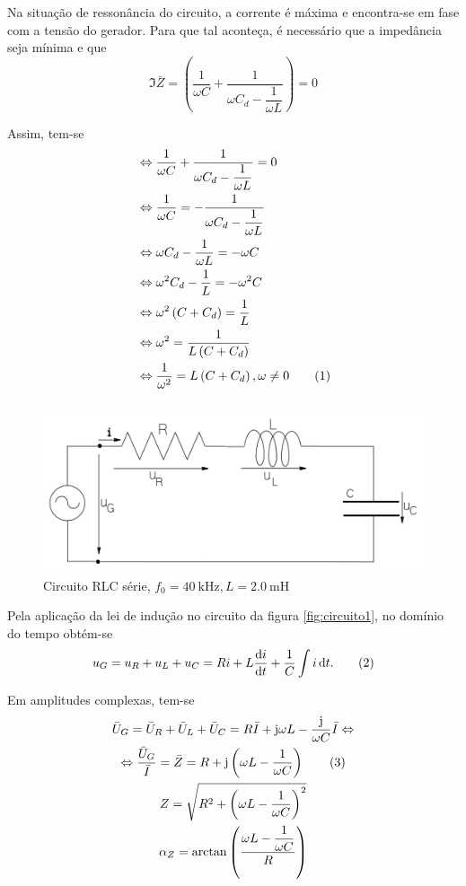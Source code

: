 \documentclass[a4paper, titlepage, portuguese]{article}
\newcommand{\eq}{\Leftrightarrow} %
\newcommand\numberthis{\addtocounter{equation}{1}\tag{\theequation}}
\begin{document}
		\par
		Na situação de ressonância do circuito, a corrente é máxima e encontra-se em fase com a tensão do gerador. Para que tal aconteça, é necessário que a impedância seja mínima e que
		\begin{equation}
			\Im{\bar{Z}} = \left(\dfrac{1}{\omega C} + \dfrac{1}{\omega C_d - \dfrac{1}{\omega L}}\right) = 0
		\end{equation}
		\par
		Assim, tem-se
		\begin{align*}
			&\Leftrightarrow \dfrac{1}{\omega C} + \dfrac{1}{\omega C_d - \dfrac{1}{\omega L}} = 0 \\
			&\Leftrightarrow \dfrac{1}{\omega C} = - \dfrac{1}{\omega C_d - \dfrac{1}{\omega L}} \\
			&\Leftrightarrow \omega C_d - \dfrac{1}{\omega L} = -\omega C \\
			&\Leftrightarrow \omega^2 C_d - \dfrac{1}{L} = -\omega^2 C \\
			&\Leftrightarrow \omega^2 \left(C + C_d \right) = \dfrac{1}{L} \\
			&\Leftrightarrow \omega^2 = \dfrac{1}{L\left(C + C_d \right)} \\
			&\Leftrightarrow \dfrac{1}{\omega^2} = L\left(C + C_d \right), \omega \neq 0 \numberthis
		\end{align*}

	\subsection{}
		\begin{figure}[h]
			\centering
			\includegraphics[width=0.6\linewidth]{circuito1.png}
			\caption{Circuito RLC série, $f_0 = \SI{40}{\kilo\hertz}, L = \SI{2,0}{\milli\henry}$ }
			\label{fig:circuito1}
		\end{figure}
		\par
		Pela aplicação da lei de indução no circuito da figura \autoref{fig:circuito1}, no domínio do tempo obtém-se
		\begin{equation*}
			u_G = u_R + u_L + u_C = Ri + L\dv{i}{t} + \dfrac{1}{C} \int{i\dd{t}}. \numberthis
		\end{equation*}
		\par
		Em amplitudes complexas, tem-se
		\begin{gather*}
			\bar{U}_G = \bar{U}_R + \bar{U}_L + \bar{U}_C = R\bar{I} + \mathrm{j} \omega L - \dfrac{\mathrm{j}}{\omega C}\bar{I} \eq \\
			\eq \dfrac{\bar{U}_G}{\bar{I}} = \bar{Z} = R + \mathrm{j}\left(\omega L - \dfrac{1}{\omega C}\right) \numberthis \\
			Z = \sqrt{R^2 + \left(\omega L - \dfrac{1}{\omega C}\right)^2} \\
			\alpha_Z = \arctan{\left(\dfrac{\omega L - \dfrac{1}{\omega C}}{R}\right)}
		\end{gather*}
\end{document}
